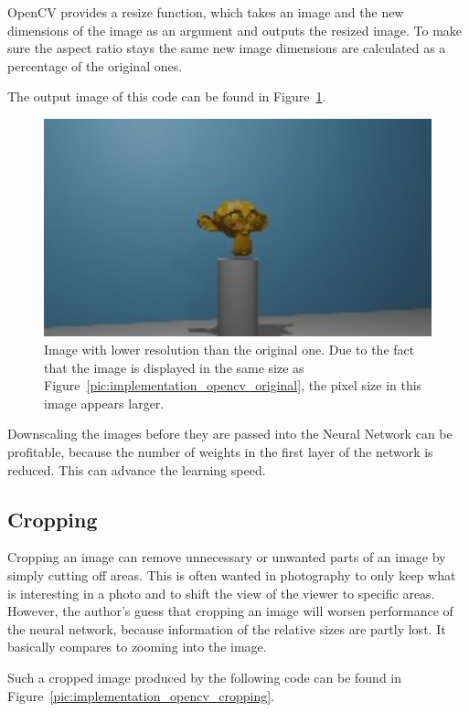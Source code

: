 OpenCV provides a resize function, which takes an image and the new dimensions of the image as an argument and outputs the resized image. To make sure the aspect ratio stays the same new image dimensions are calculated as a percentage of the original ones.

The output image of this code can be found in Figure~\ref{pic:implementation_opencv_resolution}.

\begin{figure}[h!]
	\centering
	\includegraphics[width=4.5in]{img/implementation_opencv_resolution.jpg}
	\caption{Image with lower resolution than the original one. Due to the fact that the image is displayed in the same size as Figure~\ref{pic:implementation_opencv_original}, the pixel size in this image appears larger.}
	\label{pic:implementation_opencv_resolution}
\end{figure}

Downscaling the images before they are passed into the Neural Network can be profitable, because the number of weights in the first layer of the network is reduced. This can advance the learning speed.

\subsection{Cropping}
Cropping an image can remove unnecessary or unwanted parts of an image by simply cutting off areas. This is often wanted in photography to only keep what is interesting in a photo and to shift the view of the viewer to specific areas. However, the author's guess that cropping an image will worsen performance of the neural network, because information of the relative sizes are partly lost. It basically compares to zooming into the image.

Such a cropped image produced by the following code can be found in Figure~\ref{pic:implementation_opencv_cropping}.

